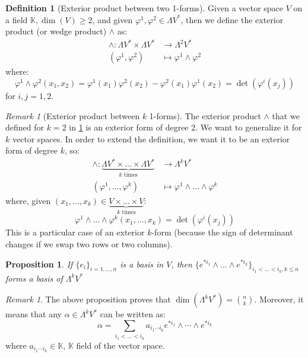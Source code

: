 \documentclass[a4paper,11pt,titlepage]{article}
\numberwithin{equation}{section}
\newtheorem{proposition}[theorem]{Proposition}
\theoremstyle{definition}
\newtheorem{definition}[theorem]{Definition}
\theoremstyle{remark}
\newtheorem{remark}[theorem]{Remark}
\begin{document}
\begin{definition}[Exterior product between two 1-forms] \label{extprod}
Given a vector space $V$ on a field $\mathbb{K}, \dim(V) \ge 2$, and given $\varphi^1, \varphi^2 \in \Lambda V^* $, then we define the exterior product (or wedge product) $\wedge$ as:
\begin{align*}
\wedge \colon \Lambda V^* \times \Lambda V^* &\rightarrow \Lambda^2 V^*  \\
(\varphi^1, \varphi^2) &\mapsto \varphi^1 \wedge \varphi^2
\end{align*}
where:
\begin{equation*}
\varphi^1 \wedge \varphi^2 (x_1, x_2) = \varphi^1(x_1) \varphi^2(x_2) - \varphi^2(x_1) \varphi^1(x_2) = \det(\varphi^i (x_j))
\end{equation*}
for $i, j=1,2$.
\end{definition}

\begin{remark}[Exterior product between $k$ 1-forms]
The exterior product $\wedge$ that we defined for $k=2$ in \ref{extprod} is an exterior form of degree 2. We want to generalize it for $k$ vector spaces. In order to extend the definition, we want it to be an exterior form of degree $k$, so:
\begin{align*}
  \wedge \colon \underbrace{\Lambda V^* \times \ldots \times \Lambda V^*}_{k \text{ times}} &\rightarrow \Lambda^k V^*  \\
  (\varphi^1, \ldots, \varphi^k) &\mapsto \varphi^1 \wedge \ldots \wedge \varphi^k
\end{align*}
where, given $(x_1, \ldots, x_k) \in \underbrace{V \times \ldots \times V}_{k \text{ times}}$:
\begin{equation*}
  \varphi^1 \wedge \ldots \wedge \varphi^k (x_1, \ldots, x_k) =  \det(\varphi^i(x_j))
\end{equation*}
This is a particular case of an exterior $k$-form (because the sign of determinant changes if we swap two rows or two columns).
\end{remark}



\begin{proposition}\label{basisprop1}
  If $\{e_i\}_{i=1,\ldots,n}$ is a basis in $V$, then $\{e^{*i_1} \wedge \ldots \wedge e^{*i_k}\}_{i_1 < \ldots < i_k, k \le n}$ forms a basis of $\Lambda ^k V^*$
\end{proposition}

\begin{remark}
  The above proposition proves that $\dim(\Lambda^k V^*)=\binom{n}{k}$. Moreover, it means that any $\alpha \in \Lambda^k V^*$ can be written as:
  \begin{equation*}
    \alpha = \sum\limits_{i_1 < \ldots < i_k} a_{i_1 \cdots i_k} e^{*i_1} \wedge \cdots \wedge e^{*i_k}
  \end{equation*}
  where $a_{i_1 \cdots i_k} \in \mathbb{K}$, $\mathbb{K}$ field of the vector space.
\end{remark}
\end{document}
